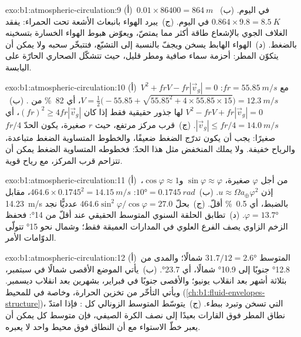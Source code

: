 \begin{solution}{exo:b1:atmospheric-circulation:9}
(أ)~$\num{0.01} \times \num{86400} = \qty{864}{m}$ في اليوم. (ب)~$0.864 \times 9.8 =
\qty{8.5}{K}$ في اليوم. (ج)~يبرد الهواء بانبعاث الأشعة تحت الحمراء: يفقد الغلاف الجوي بالإشعاع طاقة أكثر مما يمتصّ، ويعوّض هبوط الهواء الخسارة بتسخينه بالضغط. (د)~الهواء الهابط يسخن ويجفّ بالنسبة إلى التشبّع، فتتبخّر سحبه ولا يمكن أن يتكوّن المطر:  أحزمة سماء صافية ومطر قليل، حيث تتشكّل الصحاري الحارّة على اليابسة.
\end{solution}

\begin{solution}{exo:b1:atmospheric-circulation:10}
(أ)~$V^2 + frV - fr|\vec v_g| = 0$ مع $fr = \qty{55.85}{m/s}$:
$V = \tfrac12\bigl(-55.85 + \sqrt{55.85^2 + 4 \times 55.85 \times 15}\bigr) =
\qty{12.3}{m/s}$، أي \qty{82}{\percent} من . (ب)~$V^2 - frV +
fr|\vec v_g| = 0$ لها جذور حقيقية فقط إذا كان $(fr)^2 \geq 4fr|\vec v_g|$، أي
$|\vec v_g| \leq fr/4 = \qty{14.0}{m/s}$. (ج)~قرب مركز مرتفع، حيث $r$ صغيرة، يكون الحدّ $fr/4$ صغيرًا: يجب أن يكون تدرّج الضغط ضعيفًا، والخطوط المتساوية الضغط متباعدة، والرياح خفيفة. ولا يملك المنخفض مثل هذا الحدّ: فخطوطه المتساوية الضغط يمكن أن تتزاحم قرب المركز، مع رياح قوية.
\end{solution}

\begin{solution}{exo:b1:atmospheric-circulation:11}
(أ)~من أجل $\varphi$ صغيرة، $\sin\varphi \approx \varphi$ و$\cos\varphi \approx 1$، إذن $u \approx \Omega a_\oplus\varphi^2$. (ب)~$\ang{10} = \qty{0.1745}{rad}$:
$464.6 \times 0.1745^2 = \qty{14.15}{m/s}$، مقابل \qty{14.23}{m/s} بالضبط، أي \qty{0.5}{\percent} أقلّ. (ج)~بحلّ $464.6\sin^2\varphi/\cos\varphi = 27.0$ عدديًّا نجد $\varphi = \ang{13.7}$. (د)~تطابق الحلقة  السنوي المتوسط الحقيقي عند أقلّ من \ang{14}: فحفظ الزخم الزاوي يصف الفرع العلوي  في المدارات العميقة فقط؛ وشمال نحو \ang{15} تتولّى الدوّامات الأمر.
\end{solution}

\begin{solution}{exo:b1:atmospheric-circulation:12}
(أ)~المتوسط $31.7/12 = \ang{2.6}$ شمالًا؛ والمدى من \ang{12.8} جنوبًا إلى \ang{10.9} شمالًا، أي
\ang{23.7}. (ب)~يأتي الموضع الأقصى شمالًا في سبتمبر، بثلاثة أشهر بعد انقلاب يونيو؛ والأقصى جنوبًا في فبراير، بشهرين بعد انقلاب ديسمبر.
ويأتي التأخّر من تخزين الحرارة، وخاصة في  للمحيط (\cref{ch:b1:fluid-envelopes-structure})، التي تسخن وتبرد ببطء. (ج)~يتوسّط المتوسط الزونالي كل : فإذا امتدّ نطاق المطر فوق القارات بعيدًا إلى نصف الكرة الصيفي، فإن متوسط كل  يمكن أن يعبر خطّ الاستواء مع أن النطاق فوق محيط واحد لا يعبره.
\end{solution}

